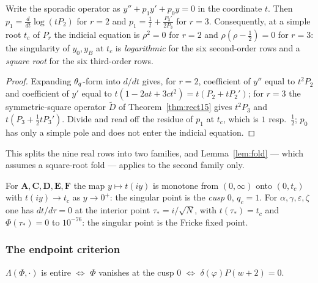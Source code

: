 \begin{lemma}\label{lem:exponents}
\Proved{} Write the sporadic operator as $y''+p_1y'+p_0y=0$ in the coordinate
$t$.  Then $p_1=\frac{d}{dt}\log(tP_2)$ for $r=2$ and
$p_1=\frac1t+\frac{P_3'}{2P_3}$ for $r=3$.  Consequently, at a simple root
$t_c$ of $P_r$ the indicial equation is $\rho^2=0$ for $r=2$ and
$\rho(\rho-\tfrac12)=0$ for $r=3$: the singularity of $y_0,y_B$ at $t_c$ is
\emph{logarithmic} for the six second-order rows and a \emph{square root} for
the six third-order rows.
\end{lemma}

\begin{proof}
Expanding $\theta_q$-form into $d/dt$ gives, for $r=2$, coefficient of $y''$ equal
to $t^2P_2$ and coefficient of $y'$ equal to $t(1-2at+3ct^2)=t(P_2+tP_2')$;
for $r=3$ the symmetric-square operator $\widetilde D$ of
Theorem~\ref{thm:rect15} gives $t^2P_3$ and $t(P_3+\tfrac12tP_3')$.  Divide and
read off the residue of $p_1$ at $t_c$, which is $1$ resp.\ $\tfrac12$; $p_0$
has only a simple pole and does not enter the indicial equation.
\end{proof}

This splits the nine real rows into two families, and Lemma~\ref{lem:fold}
--- which assumes a square-root fold --- applies to the second family only.

\begin{proposition}\label{prop:whereisfold}
For $\mathbf A,\mathbf C,\mathbf D,\mathbf E,\mathbf F$ the map $y\mapsto t(iy)$
is monotone from $(0,\infty)$ onto $(0,t_c)$ with $t(iy)\to t_c$ as $y\to0^+$:
the singular point is the \emph{cusp} $0$, $q_c=1$.  For
$\alpha,\gamma,\varepsilon,\zeta$ one has $dt/d\tau=0$ at the interior point
$\tau_*=i/\sqrt N$, with $t(\tau_*)=t_c$ and $\Phi(\tau_*)=0$ to
$10^{-76}$: the singular point is the Fricke fixed point.
\end{proposition}

\subsubsection*{The endpoint criterion}

\begin{lemma}\label{lem:endpoint}
\Proved{} $\Lambda(\Phi,\cdot)$ is entire $\iff$ $\Phi$ vanishes at the cusp
$0$ $\iff$ $\delta(\varphi)P(w+2)=0$.
\end{lemma}

